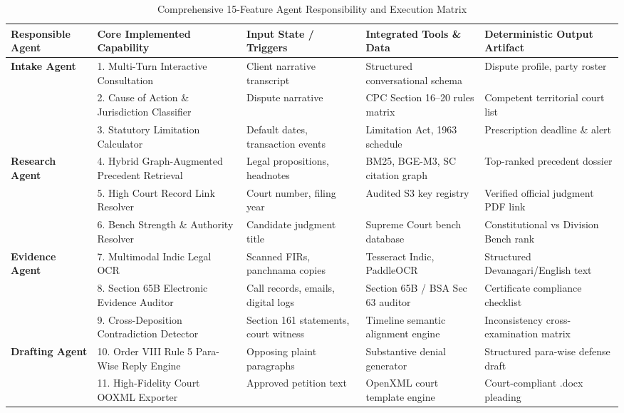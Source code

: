 \documentclass[conference]{IEEEtran}
\begin{document}
\begin{table}[t]
\caption{Comprehensive 15-Feature Agent Responsibility and Execution Matrix}
\label{tab:matrix}
\centering
\scriptsize
\setlength{\tabcolsep}{3.5pt}
\begin{tabular}{lp{3.2cm}p{3.4cm}p{3.4cm}p{2.8cm}}
\toprule
\textbf{Responsible Agent} & \textbf{Core Implemented Capability} & \textbf{Input State / Triggers} & \textbf{Integrated Tools \& Data} & \textbf{Deterministic Output Artifact} \\
\midrule
\multirow{3}{*}{\textbf{Intake Agent}} & 1. Multi-Turn Interactive Consultation & Client narrative transcript & Structured conversational schema & Dispute profile, party roster \\
 & 2. Cause of Action \& Jurisdiction Classifier & Dispute narrative & CPC Section 16--20 rules matrix & Competent territorial court list \\
 & 3. Statutory Limitation Calculator & Default dates, transaction events & Limitation Act, 1963 schedule & Prescription deadline \& alert \\
\midrule
\multirow{3}{*}{\textbf{Research Agent}} & 4. Hybrid Graph-Augmented Precedent Retrieval & Legal propositions, headnotes & BM25, BGE-M3, SC citation graph & Top-ranked precedent dossier \\
 & 5. High Court Record Link Resolver & Court number, filing year & Audited S3 key registry & Verified official judgment PDF link \\
 & 6. Bench Strength \& Authority Resolver & Candidate judgment title & Supreme Court bench database & Constitutional vs Division Bench rank \\
\midrule
\multirow{3}{*}{\textbf{Evidence Agent}} & 7. Multimodal Indic Legal OCR & Scanned FIRs, panchnama copies & Tesseract Indic, PaddleOCR & Structured Devanagari/English text \\
 & 8. Section 65B Electronic Evidence Auditor & Call records, emails, digital logs & Section 65B / BSA Sec 63 auditor & Certificate compliance checklist \\
 & 9. Cross-Deposition Contradiction Detector & Section 161 statements, court witness & Timeline semantic alignment engine & Inconsistency cross-examination matrix \\
\midrule
\multirow{2}{*}{\textbf{Drafting Agent}} & 10. Order VIII Rule 5 Para-Wise Reply Engine & Opposing plaint paragraphs & Substantive denial generator & Structured para-wise defense draft \\
 & 11. High-Fidelity Court OOXML Exporter & Approved petition text & OpenXML court template engine & Court-compliant .docx pleading \\

\end{tabular}
\end{table}
\end{document}
